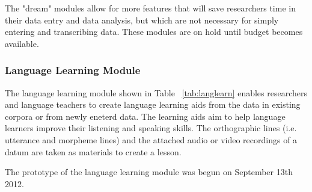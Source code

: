 \documentclass[12 pt]{article}
\begin{document}
The "dream" modules allow for more features that will save researchers time in their data entry and data analysis, but which are not necessary for simply entering and transcribing data. These modules are on hold until budget becomes available.


\subsubsection{Language Learning Module}
The language learning module shown in Table ~\ref{tab:langlearn} enables researchers and language teachers to create language learning aids from the data in existing corpora or from newly eneterd data. The learning aids aim to help language learners improve their listening and speaking skills. The orthographic lines (i.e. utterance and morpheme lines) and the attached audio or video recordings of a datum are taken as materials to create a lesson. 


The prototype of the language learning module was begun on September 13th 2012.
\end{document}
